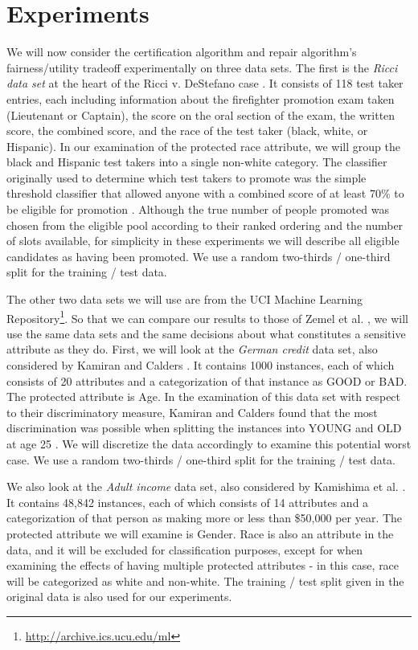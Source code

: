 \section{Experiments}
\label{sec:experiments}
We will now consider the certification algorithm and repair algorithm's fairness/utility tradeoff experimentally on three data sets.  The first is the \emph{Ricci data set} at the heart of the Ricci v. DeStefano case \cite{Ricci09}.  It consists of 118 test taker entries, each including information about the firefighter promotion exam taken (Lieutenant or Captain), the score on the oral section of the exam, the written score, the combined score, 
and the race of the test taker (black, white, or Hispanic).  In our examination of the protected race attribute, we will group the black and Hispanic test takers into a single non-white category.  The classifier originally used to determine which test takers to promote was the simple threshold classifier that allowed anyone with a combined score of at least 70\% to be eligible for promotion \cite{Miao11RicciStats}.  Although the true number of people promoted was chosen from the eligible pool according to their ranked ordering and the number of slots available, for simplicity in these experiments we will describe all eligible candidates as having been promoted.  We use a random two-thirds / one-third split for the training / test data.

 The other two data sets we will use are from the UCI Machine Learning Repository\footnote{\url{http://archive.ics.ucu.edu/ml}}.  So that we can compare our results to those of Zemel et al. \cite{icml2013_zemel13}, we will use the same data sets and the same decisions about what constitutes a sensitive attribute as they do.  First, we will look at the \emph{German credit} data set, also considered by  Kamiran and Calders \cite{Kamiran09Classifying}.  It contains 1000 instances, each of which consists of 20 attributes and a categorization of that instance as GOOD or BAD.  The protected attribute is Age.  In the examination of this data set with respect to their discriminatory measure, Kamiran and Calders found that the most discrimination was possible when splitting the instances into YOUNG and OLD at age 25 \cite{Kamiran09Classifying}.  We will discretize the data accordingly to examine this potential worst case.  We use a random two-thirds / one-third split for the training / test data.


We also look at the \emph{Adult income} data set, also considered by Kamishima et al. \cite{Kamishima11Fairness}.  It contains 48,842 instances, each of which consists of 14 attributes and a categorization of that person as making more or less than \$50,000 per year.  The protected attribute we will examine is Gender.  Race is also an attribute in the data, and it will be excluded for classification purposes, except for when examining the effects of having multiple protected attributes - in this case, race will be categorized as white and non-white. The training / test split given in the original data is also used for our experiments.

